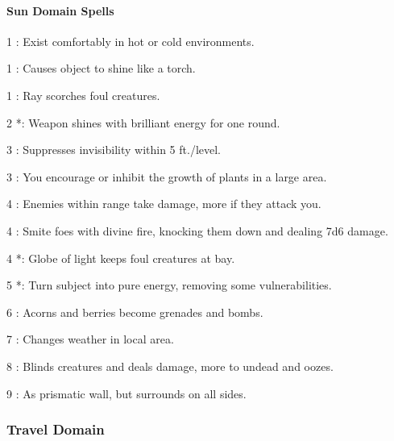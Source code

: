 \paragraph{Sun Domain Spells}
\begin{list}{}{\leftmargin=1em}
\item[1] : Exist comfortably in hot or cold environments.
\item[1] : Causes object to shine like a torch.
\item[1] : Ray scorches foul creatures.
\item[2] *: Weapon shines with brilliant energy for one round.
\item[3] : Suppresses invisibility within 5 ft./level.
\item[3] : You encourage or inhibit the growth of plants in a large area.
\item[4] : Enemies within range take damage, more if they attack you.
\item[4] : Smite foes with divine fire, knocking them down and dealing 7d6 damage.
\item[4] *: Globe of light keeps foul creatures at bay.
\item[5] *: Turn subject into pure energy, removing some vulnerabilities.
\item[6] : Acorns and berries become grenades and bombs.
\item[7] : Changes weather in local area.
\item[8] : Blinds creatures and deals damage, more to undead and oozes.
\item[9] : As prismatic wall, but surrounds on all sides.
\end{list}
\subsubsection{Travel Domain}
